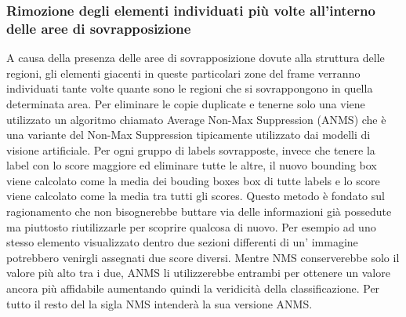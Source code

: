 \subsubsection{Rimozione degli elementi individuati più volte all'interno delle aree di sovrapposizione}
A causa della presenza delle aree di sovrapposizione dovute alla struttura delle regioni, gli elementi giacenti in queste particolari zone del frame verranno individuati tante volte quante sono le regioni che si sovrappongono in quella determinata area. Per eliminare le copie duplicate e tenerne solo una viene utilizzato un algoritmo chiamato Average Non-Max Suppression (ANMS) che è una variante del Non-Max Suppression tipicamente utilizzato dai modelli di visione artificiale. Per ogni gruppo di labels sovrapposte, invece che tenere la label con lo score maggiore ed eliminare tutte le altre, il nuovo bounding box viene calcolato come la media dei bouding boxes box di tutte labels e lo score viene calcolato come la media tra tutti gli scores.
Questo metodo è fondato sul ragionamento che non bisognerebbe buttare via delle informazioni già possedute ma piuttosto riutilizzarle per scoprire qualcosa di nuovo. Per esempio ad uno stesso elemento visualizzato dentro due sezioni differenti di un' immagine potrebbero venirgli assegnati due score diversi. Mentre NMS conserverebbe solo il valore più alto tra i due, ANMS li utilizzerebbe entrambi per ottenere un valore ancora più affidabile aumentando quindi la veridicità della classificazione. Per tutto il resto del la sigla NMS intenderà la sua versione ANMS.
